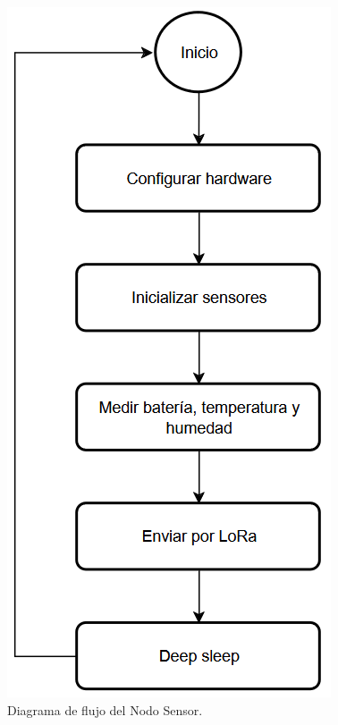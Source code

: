\begin{figure}[H]
    \centering
    \includegraphics[width=0.5\linewidth]{Figures/Firmware/flujo_medidor.png}
    \caption{Diagrama de flujo del Nodo Sensor.}
    \label{fig:diagrama-flujo-sensor}
\end{figure}

